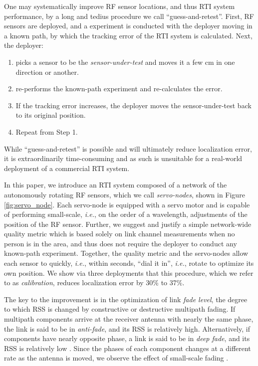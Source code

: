 \documentclass[conference]{IEEEtran}
\begin{document}
One may systematically improve RF sensor locations, and thus RTI system performance, by a long and tedius procedure we call ``guess-and-retest''.  First, RF sensors are deployed, and a experiment is conducted with the deployer moving in a known path, by which the tracking error of the RTI system is calculated.  Next, the deployer:
\begin{enumerate}
\item picks a sensor to be the \emph{sensor-under-test} and moves it a few cm in one direction or another.
\item re-performs the known-path experiment and re-calculates the error.  
\item If the tracking error increases, the deployer moves the sensor-under-test back to its original position.
\item Repeat from Step 1.
\end{enumerate}
While ``guess-and-retest'' is possible and will ultimately reduce localization error, it is extraordinarily time-consuming and as such is unsuitable for a real-world deployment of a commercial RTI system.  

In this paper, we introduce an RTI system composed of a network of the autonomously rotating RF sensors, which we call \emph{servo-nodes}, shown in Figure \ref{fig:servo_node}. Each servo-node is equipped with a servo motor and is capable of performing small-scale, \emph{i.e.}, on the order of a wavelength, adjustments of the position of the RF sensor.  Further, we suggest and justify a simple network-wide quality metric which is based solely on link channel measurements when no person is in the area, and thus does not require the deployer to conduct any known-path experiment.  Together, the quality metric and the servo-nodes allow each sensor to quickly, \emph{i.e.}, within seconds, ``dial it in'', \emph{i.e.}, rotate to optimize its own position.  We show via three deployments that this procedure, which we refer to as \emph{calibration}, reduces localization error by 30\% to 37\%.

The key to the improvement is in the optimization of link \emph{fade level}, the degree to which RSS is changed by constructive or destructive multipath fading.  If multipath components arrive at the receiver antenna with nearly the same phase, the link is said to be in \emph{anti-fade}, and its RSS is relatively high. Alternatively, if components have nearly opposite phase, a link is said to be in \emph{deep fade}, and its RSS is relatively low \cite{Wilson_SkewL_2011}. Since the phases of each component changes at a different rate as the antenna is moved, we observe the effect of small-scale fading \cite{Rappaport_book}.  
\end{document}
